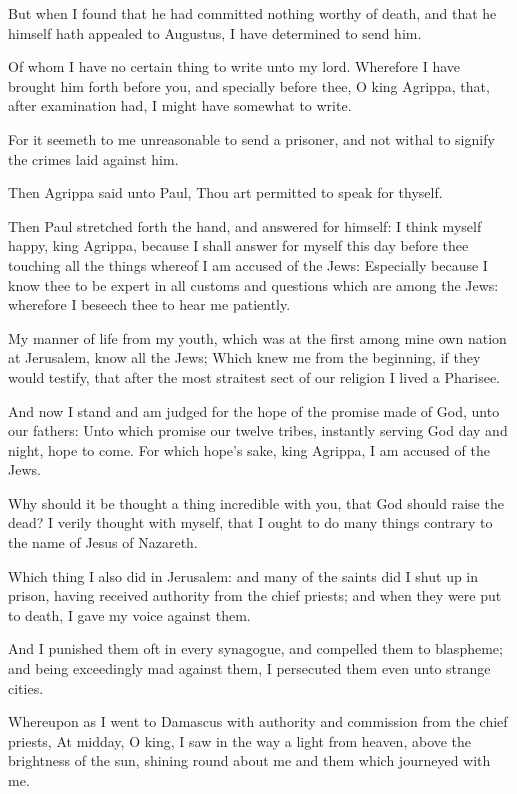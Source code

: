 \Verse But when I found that he had committed nothing worthy of death, and that he himself hath appealed to Augustus, I have determined to send him.

\Verse Of whom I have no certain thing to write unto my lord. Wherefore I have brought him forth before you, and specially before thee, O king Agrippa, that, after examination had, I might have somewhat to write.

\Verse For it seemeth to me unreasonable to send a prisoner, and not withal to signify the crimes laid against him.


\Chapter
\Verse Then Agrippa said unto Paul, Thou art permitted to speak for thyself.

Then Paul stretched forth the hand, and answered for himself: \Verse I think myself happy, king Agrippa, because I shall answer for myself this day before thee touching all the things whereof I am accused of the Jews: \Verse Especially because I know thee to be expert in all customs and questions which are among the Jews: wherefore I beseech thee to hear me patiently.

\Verse My manner of life from my youth, which was at the first among mine own nation at Jerusalem, know all the Jews; \Verse Which knew me from the beginning, if they would testify, that after the most straitest sect of our religion I lived a Pharisee.

\Verse And now I stand and am judged for the hope of the promise made of God, unto our fathers: \Verse Unto which promise our twelve tribes, instantly serving God day and night, hope to come. For which hope's sake, king Agrippa, I am accused of the Jews.

\Verse Why should it be thought a thing incredible with you, that God should raise the dead?  \Verse I verily thought with myself, that I ought to do many things contrary to the name of Jesus of Nazareth.

\Verse Which thing I also did in Jerusalem: and many of the saints did I shut up in prison, having received authority from the chief priests; and when they were put to death, I gave my voice against them.

\Verse And I punished them oft in every synagogue, and compelled them to blaspheme; and being exceedingly mad against them, I persecuted them even unto strange cities.

\Verse Whereupon as I went to Damascus with authority and commission from the chief priests, \Verse At midday, O king, I saw in the way a light from heaven, above the brightness of the sun, shining round about me and them which journeyed with me.

